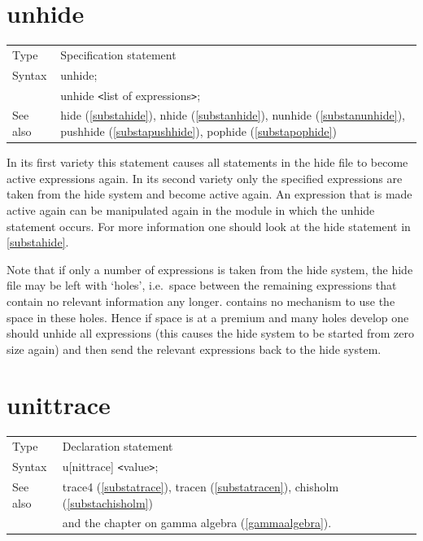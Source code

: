
\section{unhide}
\label{substaunhide}

\noindent \begin{tabular}{ll}
Type & Specification statement\\
Syntax & unhide; \\
       & unhide {\tt<}list of expressions{\tt>};
\\ See also & hide (\ref{substahide}),
              nhide (\ref{substanhide}),
              nunhide (\ref{substanunhide}),
              pushhide (\ref{substapushhide}),
              pophide (\ref{substapophide})
\end{tabular} \vspace{4mm}

\noindent In its first variety this statement causes all 
statements in the hide file to become 
active expressions again. In its second variety only the 
specified expressions are taken from the hide system and become active 
again. An expression that is made active again can be manipulated again in 
the module in which the unhide statement occurs. For more information one 
should look at the hide statement in \ref{substahide}. \vspace{4mm}

\noindent Note that if only a number of expressions is taken from the hide 
system, the hide file may be left with `holes', i.e.\ space between the 
remaining expressions that contain no relevant information any longer. 
{\FORM} contains no mechanism to use the space in these holes. Hence if 
space is at a premium and many holes develop one should unhide all 
expressions (this causes the hide system to be started from zero size 
again) and then send the relevant expressions back to the hide system. 
\vspace{10mm}


\section{unittrace}
\label{substaunittrace}

\noindent \begin{tabular}{ll}
Type & Declaration statement\\
Syntax & u[nittrace] {\tt<}value{\tt>}; \\
See also & trace4 (\ref{substatrace}), tracen (\ref{substatracen}),
    chisholm (\ref{substachisholm}) \\ &
    and the chapter on gamma algebra (\ref{gammaalgebra}).
\end{tabular} \vspace{4mm}


